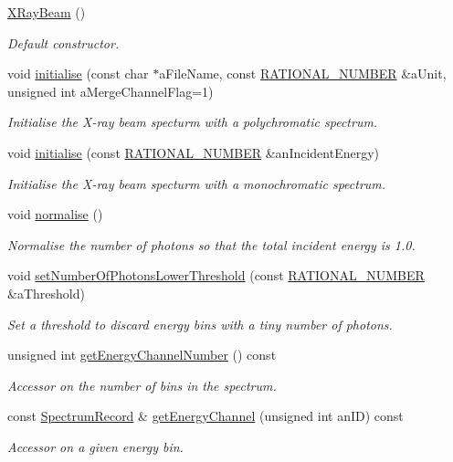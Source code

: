 \begin{DoxyCompactItemize}
\item 
\hyperlink{classg_virtual_x_ray_1_1_x_ray_beam_acc2516eafa024fd55c922fda31c05cf1}{XRayBeam} ()
\begin{DoxyCompactList}\small\item\em Default constructor. \end{DoxyCompactList}\item 
void \hyperlink{classg_virtual_x_ray_1_1_x_ray_beam_a8fca507a5d6a8e6c1c9607f0e9ddb1e4}{initialise} (const char $\ast$aFileName, const \hyperlink{namespace_utilities_a40969b96bd8d847b962e297cb79f08ce}{RATIONAL\_\-NUMBER} \&aUnit, unsigned int aMergeChannelFlag=1)
\begin{DoxyCompactList}\small\item\em Initialise the X-\/ray beam specturm with a polychromatic spectrum. \end{DoxyCompactList}\item 
void \hyperlink{classg_virtual_x_ray_1_1_x_ray_beam_a9098d87242fdedd548b87cc6fe1414f9}{initialise} (const \hyperlink{namespace_utilities_a40969b96bd8d847b962e297cb79f08ce}{RATIONAL\_\-NUMBER} \&anIncidentEnergy)
\begin{DoxyCompactList}\small\item\em Initialise the X-\/ray beam specturm with a monochromatic spectrum. \end{DoxyCompactList}\item 
void \hyperlink{classg_virtual_x_ray_1_1_x_ray_beam_a34219da39048ef19cdb984fc7df33ee0}{normalise} ()
\begin{DoxyCompactList}\small\item\em Normalise the number of photons so that the total incident energy is 1.0. \end{DoxyCompactList}\item 
void \hyperlink{classg_virtual_x_ray_1_1_x_ray_beam_a96b9f89afb0b7c5e52c35ad16544364f}{setNumberOfPhotonsLowerThreshold} (const \hyperlink{namespace_utilities_a40969b96bd8d847b962e297cb79f08ce}{RATIONAL\_\-NUMBER} \&aThreshold)
\begin{DoxyCompactList}\small\item\em Set a threshold to discard energy bins with a tiny number of photons. \end{DoxyCompactList}\item 
unsigned int \hyperlink{classg_virtual_x_ray_1_1_x_ray_beam_a80658e6d864130431b2eaed3a5ae9095}{getEnergyChannelNumber} () const 
\begin{DoxyCompactList}\small\item\em Accessor on the number of bins in the spectrum. \end{DoxyCompactList}\item 
const \hyperlink{classg_virtual_x_ray_1_1_spectrum_record}{SpectrumRecord} \& \hyperlink{classg_virtual_x_ray_1_1_x_ray_beam_a1cf7093fc484de7e727f0dd52c1c94f5}{getEnergyChannel} (unsigned int anID) const 
\begin{DoxyCompactList}\small\item\em Accessor on a given energy bin. \end{DoxyCompactList}\end{DoxyCompactItemize}
